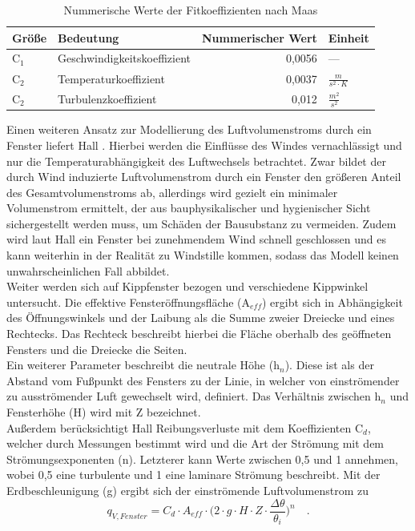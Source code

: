\begin{table}[H] \centering
\begin{tabular}{|l|l|r|l|}
\hline
\rowcolor[HTML]{C0C0C0} 
Größe & Bedeutung & \multicolumn{1}{l|}{\cellcolor[HTML]{C0C0C0}Nummerischer Wert} & Einheit \\ \hline
C\(_1\) & Geschwindigkeitskoeffizient & 0,0056 & --- \\ \hline
\rowcolor[HTML]{EFEFEF} 
C\(_2\) & Temperaturkoeffizient & 0,0037 & \(\frac{m}{s^2 \cdot K}\) \\ \hline
C\(_2\) & Turbulenzkoeffizient & 0,012 & \(\frac{m^2}{s^2}\) \\ \hline
\end{tabular}
\caption{Nummerische Werte der Fitkoeffizienten nach Maas \cite{Maas.1995}}
\label{tab: Tabelle3312}
\end{table}

Einen weiteren Ansatz zur Modellierung des Luftvolumenstroms durch ein Fenster liefert Hall \cite{Hall.2004}.
Hierbei werden die Einflüsse des Windes vernachlässigt und nur die Temperaturabhängigkeit des Luftwechsels betrachtet.
Zwar bildet der durch Wind induzierte Luftvolumenstrom durch ein Fenster den größeren Anteil des Gesamtvolumenstroms ab, allerdings wird gezielt ein minimaler Volumenstrom ermittelt, der aus bauphysikalischer und hygienischer Sicht sichergestellt werden muss, um Schäden der Bausubstanz zu vermeiden.
Zudem wird laut Hall ein Fenster bei zunehmendem Wind schnell geschlossen und es kann weiterhin in der Realität zu Windstille kommen, sodass das Modell keinen unwahrscheinlichen Fall abbildet.\\
Weiter werden sich auf Kippfenster bezogen und verschiedene Kippwinkel untersucht.
Die effektive Fensteröffnungsfläche (A\(_{eff}\)) ergibt sich in Abhängigkeit des Öffnungswinkels und der Laibung als die Summe zweier Dreiecke und eines Rechtecks.
Das Rechteck beschreibt hierbei die Fläche oberhalb des geöffneten Fensters und die Dreiecke die Seiten.\\
Ein weiterer Parameter beschreibt die neutrale Höhe (h\(_n\)). 
Diese ist als der Abstand vom Fußpunkt des Fensters zu der Linie, in welcher von einströmender zu ausströmender Luft gewechselt wird, definiert.
Das Verhältnis zwischen h\(_n\) und Fensterhöhe (H) wird mit Z bezeichnet.\\
Außerdem berücksichtigt Hall Reibungsverluste mit dem Koeffizienten C\(_d\), welcher durch Messungen bestimmt wird und die Art der Strömung mit dem Strömungsexponenten (n). 
Letzterer kann Werte zwischen 0,5 und 1 annehmen, wobei 0,5 eine turbulente und 1 eine laminare Strömung beschreibt.
Mit der Erdbeschleunigung (g) ergibt sich der einströmende Luftvolumenstrom zu
\begin{equation}
\label{eq:Gleichung3312}
q_{V, Fenster} = C_d \cdot A_{eff} \cdot \Biggl( 2 \cdot g \cdot H \cdot Z \cdot \frac{\Delta\theta}{\theta_i}\Biggr)^n \quad \text{.}
\end{equation}


